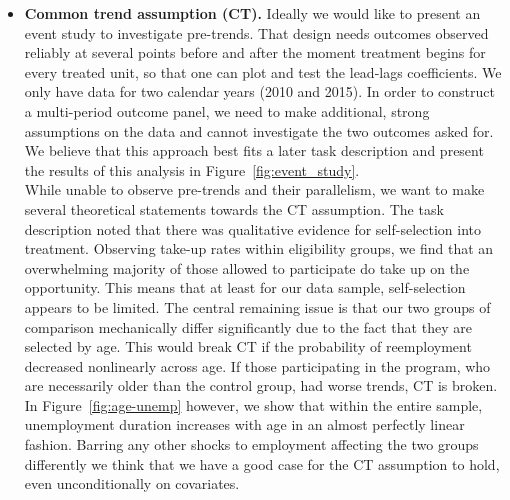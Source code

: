 \documentclass{scrartcl}
\begin{document}
\begin{itemize}[label=$\blacktriangleright$]
    \item \textbf{Common trend assumption (CT).} Ideally we would like to present an event study to investigate pre-trends. That design needs outcomes observed reliably at several points before and after the moment treatment begins for every treated unit, so that one can plot and test the lead-lags coefficients. We only have data for two calendar years (2010 and 2015). In order to construct a multi-period outcome panel, we need to make additional, strong assumptions on the data and cannot investigate the two outcomes asked for. We believe that this approach best fits a later task description and present the results of this analysis in Figure~\ref{fig:event_study}. \\
    
    While unable to observe pre-trends and their parallelism, we want to make several theoretical statements towards the CT assumption. The task description noted that there was qualitative evidence for self-selection into treatment. Observing take-up rates within eligibility groups, we find that an overwhelming majority of those allowed to participate do take up on the opportunity. This means that at least for our data sample, self-selection appears to be limited. The central remaining issue is that our two groups of comparison mechanically differ significantly due to the fact that they are selected by age. This would break CT if the probability of reemployment decreased nonlinearly across age. If those participating in the program, who are necessarily older than the control group, had worse trends, CT is broken. In Figure~\ref{fig:age-unemp} however, we show that within the entire sample, unemployment duration increases with age in an almost perfectly linear fashion. Barring any other shocks to employment affecting the two groups differently we think that we have a good case for the CT assumption to hold, even unconditionally on covariates.

\end{itemize}
\end{document}
